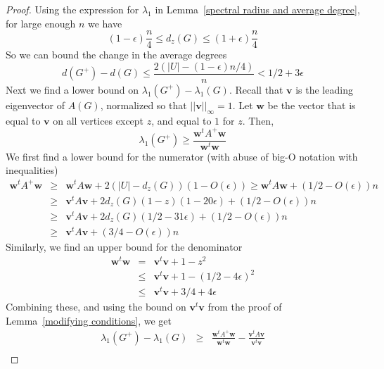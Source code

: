 \begin{proof}
\noindent Using the expression for $\lambda_1$ in Lemma~\ref{spectral radius and average degree}, for large enough $n$ we have
 \[ \left(1-\epsilon\right)\frac{n}{4} \leq d_z(G) \leq \left(1+\epsilon\right) \frac{n}{4}\]
So we can bound the change in the average degrees
 \[ d(G^+) - d(G) \leq \frac{2(|U| - (1-\epsilon)n/4)}{n}< 1/2 + 3\epsilon\]
Next we find a lower bound on $\lambda_1(G^+) - \lambda_1(G)$.  Recall that $\textbf{v}$
is the leading eigenvector of $A(G)$, normalized so that $||\textbf{v}||_\infty = 1$.  Let $\textbf{w}$ be the vector that is equal to $\textbf{v}$ on all 
vertices except $z$, and equal to $1$ for $z$.  Then, 
 \[ \lambda_1(G^+) \geq \frac{\textbf{w}^tA^+\textbf{w}}{\textbf{w}^t\textbf{w}}\] 
We first find a lower bound for the numerator (with abuse of big-O notation with inequalities)
\begin{eqnarray*} 
\textbf{w}^tA^+\textbf{w} & \geq & \textbf{w}^tA\textbf{w} + 2(|U| - d_z(G))(1-O(\epsilon)) \geq \textbf{w}^tA\textbf{w} + (1/2-O(\epsilon))n \\
& \geq &  \textbf{v}^tA\textbf{v} + 2d_z(G) \left(1-z\right)(1-20\epsilon) + (1/2-O(\epsilon))n \\
& \geq &  \textbf{v}^tA\textbf{v} + 2d_z(G) \left(1/2 - 31\epsilon\right) + (1/2-O(\epsilon))n \\
& \geq &  \textbf{v}^tA\textbf{v} + (3/4-O(\epsilon))n
\end{eqnarray*}
Similarly, we find an upper bound for the denominator
\begin{eqnarray*}
\textbf{w}^t \textbf{w} &=& \textbf{v}^t\textbf{v} + 1 - z^2 \\
&\leq& \textbf{v}^t\textbf{v} + 1 - (1/2 - 4\epsilon)^2 \\
&\leq& \textbf{v}^t\textbf{v} + 3/4 + 4\epsilon
\end{eqnarray*}
Combining these, and using the bound on $\textbf{v}^t\textbf{v}$ from
the proof of Lemma~\ref{modifying conditions}, we get
\begin{eqnarray*}
 \lambda_1(G^+) - \lambda_1(G) &\geq& \frac{\textbf{w}^tA^+\textbf{w}}{\textbf{w}^t\textbf{w}} - \frac{\textbf{v}^tA\textbf{v}}{\textbf{v}^t\textbf{v}}\\

\end{eqnarray*}
\end{proof}
